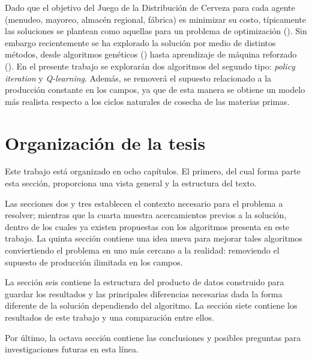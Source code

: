 Dado que el objetivo del Juego de la Distribuci\'on de Cerveza para cada agente (menudeo, mayoreo, almac\'en regional, f\'abrica) es minimizar su costo, t\'ipicamente las soluciones se plantean como aquellas para un problema de optimizaci\'on (\citet{Sterman}). Sin embargo recientemente se ha explorado la soluci\'on por medio de distintos m\'etodos, desde algoritmos gen\'eticos (\citet{Strozzi}) hasta aprendizaje de m\'aquina reforzado (\citet{Chaharsooghi}). En el presente trabajo se explorar\'an dos algoritmos del segundo tipo: \textit{policy iteration} y \textit{Q-learning}. Adem\'as, se remover\'a el supuesto relacionado a la producci\'on constante en los campos, ya que de esta manera se obtiene un modelo m\'as realista respecto a los ciclos naturales de cosecha de las materias primas.

\section{Organizaci\'on de la tesis}

Este trabajo est\'a organizado en ocho cap\'itulos. El primero, del cual forma parte esta secci\'on, proporciona una vista general y la estructura del texto.

Las secciones dos y tres establecen el contexto necesario para el problema a resolver; mientras que la cuarta muestra acercamientos previos a la soluci\'on, dentro de los cuales ya existen propuestas con los algoritmos presenta en este trabajo. La quinta secci\'on contiene una idea nueva para mejorar tales algoritmos conviertiendo el problema en uno m\'as cercano a la realidad: removiendo el supuesto de producci\'on ilimitada en los campos.

La secci\'on seis contiene la estructura del producto de datos construido para guardar los resultados y las principales diferencias necesarias dada la forma diferente de la soluci\'on dependiendo del algoritmo. La secci\'on siete contiene los resultados de este trabajo y una comparaci\'on entre ellos.

Por \'ultimo, la octava secci\'on contiene las conclusiones y posibles preguntas para investigaciones futuras en esta l\'inea.